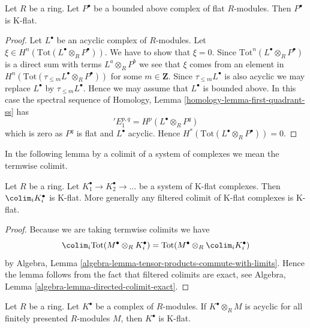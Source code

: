\begin{lemma}
\label{lemma-derived-tor-quasi-isomorphism}
Let $R$ be a ring. Let $P^\bullet$ be a bounded above complex of
flat $R$-modules. Then $P^\bullet$ is K-flat.
\end{lemma}

\begin{proof}
Let $L^\bullet$ be an acyclic complex of $R$-modules.
Let $\xi \in H^n(\text{Tot}(L^\bullet \otimes_R P^\bullet))$.
We have to show that $\xi = 0$.
Since $\text{Tot}^n(L^\bullet \otimes_R P^\bullet)$ is a direct
sum with terms $L^a \otimes_R P^b$ we see that $\xi$ comes from
an element in $H^n(\text{Tot}(\tau_{\leq m}L^\bullet \otimes_R P^\bullet))$
for some $m \in \mathbf{Z}$. Since $\tau_{\leq m}L^\bullet$ is also
acyclic we may replace $L^\bullet$ by $\tau_{\leq m}L^\bullet$.
Hence we may assume that $L^\bullet$ is bounded above.
In this case the spectral sequence of
Homology, Lemma \ref{homology-lemma-first-quadrant-ss}
has
$$
{}'E_1^{p, q} = H^p(L^\bullet \otimes_R P^q)
$$
which is zero as $P^q$ is flat and $L^\bullet$ acyclic. Hence
$H^*(\text{Tot}(L^\bullet \otimes_R P^\bullet)) = 0$.
\end{proof}

\noindent
In the following lemma by a colimit of a system of complexes we mean
the termwise colimit.

\begin{lemma}
\label{lemma-colimit-K-flat}
Let $R$ be a ring.
Let $K_1^\bullet \to K_2^\bullet \to \ldots$
be a system of K-flat complexes.
Then $\colim_i K_i^\bullet$ is K-flat.
More generally any filtered colimit of K-flat complexes
is K-flat.
\end{lemma}

\begin{proof}
Because we are taking termwise colimits we have
$$
\colim_i \text{Tot}(M^\bullet \otimes_R K_i^\bullet) =
\text{Tot}(M^\bullet \otimes_R \colim_i K_i^\bullet)
$$
by Algebra, Lemma \ref{algebra-lemma-tensor-products-commute-with-limits}.
Hence the lemma follows from the fact that filtered colimits are
exact, see Algebra, Lemma \ref{algebra-lemma-directed-colimit-exact}.
\end{proof}

\begin{lemma}
\label{lemma-universally-acyclic-K-flat}
Let $R$ be a ring. Let $K^\bullet$ be a complex of $R$-modules.
If $K^\bullet \otimes_R M$ is acyclic for all finitely presented
$R$-modules $M$, then $K^\bullet$ is K-flat.
\end{lemma}

